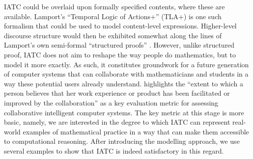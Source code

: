 \documentclass[smallextended,oneside]{svjour3}       %
\let\cite\citep
\begin{document}
IATC could be overlaid upon formally specified contents, where these are available.  Lamport's ``Temporal Logic of Actions+'' (TLA+) \cite{lamport1999specifying,lamport2014tla2} is one such formalism that could be used to model content-level expressions.  Higher-level discourse structure would then be exhibited somewhat along the lines of Lamport's own semi-formal ``structured proofs'' 
\cite{lamport1995write,lamport2012write21st}.  However, unlike structured proof, IATC does not aim to reshape the way people do mathematics, but to model it more exactly.  As such, it constitutes groundwork for a future generation of computer systems that can collaborate with mathematicians and students in a way these potential users already understand. \citet{epstein2015wanted} highlights the ``extent to which a person believes that her work experience or product has been facilitated or improved by the collaboration'' as a key evaluation metric for assessing collaborative intelligent computer systems. The key metric at this stage is more basic, namely, we are interested in the degree to which IATC can represent real-world examples of mathematical practice in a way that can make them accessible to computational reasoning. After introducing the modelling approach, we use several examples to show that IATC is indeed satisfactory in this regard.
\end{document}
